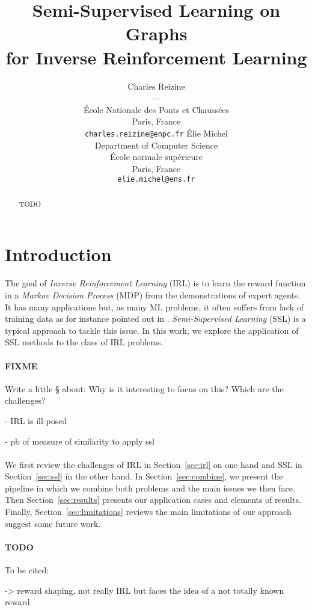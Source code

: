 \documentclass{article}
\title{Semi-Supervised Learning on Graphs \\
for Inverse Reinforcement Learning}
\author{
Charles Reizine\\
---\\
École Nationale des Ponts et Chaussées\\
Paris, France\\
\texttt{charles.reizine@enpc.fr}
\And
Élie Michel\\
Department of Computer Science\\
École normale supérieure\\
Paris, France\\
\texttt{elie.michel@ens.fr}
}
\begin{document}
\maketitle

\begin{abstract}
TODO
\end{abstract}

\section{Introduction}

The goal of \emph{Inverse Reinforcement Learning} (IRL) is to learn the reward function in a \emph{Markov Decision Process} (MDP) from the demonstrations of expert agents. It has many applications \cite{Kaelbling96} but, as many ML problems, it often suffers from lack of training data as for instance pointed out in \cite{Vasquez14}. \emph{Semi-Supervised Learning} (SSL) is a typical approach to tackle this issue. In this work, we explore the application of SSL methods to the class of IRL problems.

\paragraph{FIXME}
Write a little § about:
Why is it interesting to focus on this?
Which are the challenges?

 - IRL is ill-posed

 - pb of measure of similarity to apply ssl

\paragraph{}
We first review the challenges of IRL in Section~\ref{sec:irl} on one hand and SSL in Section~\ref{sec:ssl} in the other hand. In Section~\ref{sec:combine}, we present the pipeline in which we combine both problems and the main issues we then face. Then Section~\ref{sec:results} presents our application cases and elements of results. Finally, Section~\ref{sec:limitations} reviews the main limitations of our approach suggest some future work.


\paragraph{TODO} To be cited:

\cite{Ng99} -> reward shaping, not really IRL but faces the idea of a not totally known reward
\end{document}
